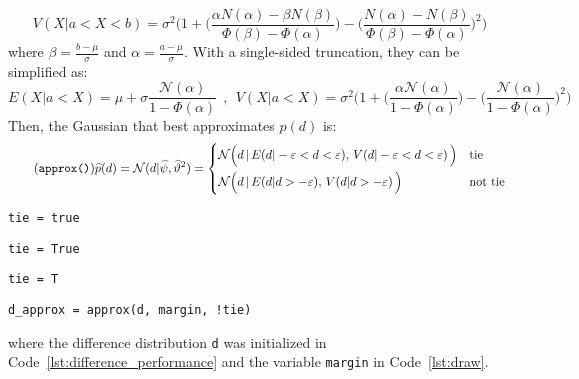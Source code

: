 \documentclass[article]{jss}
\newcommand{\N}{\mathcal{N}}
\begin{document}
%
\begin{equation}\label{eq:variance_aprox_double}
 V(X| a < X < b) = \sigma^2 \Bigg( 1 + \bigg(\frac{\alpha N(\alpha) - \beta N(\beta) }{\Phi(\beta) - \Phi(\alpha) }\bigg) - \bigg(\frac{N(\alpha) - N(\beta) }{\Phi(\beta) - \Phi(\alpha) }\bigg)^2 \Bigg)
\end{equation}
where $\beta = \frac{b-\mu}{\sigma}$ and $\alpha = \frac{a-\mu}{\sigma}$. 
With a single-sided truncation, they can be simplified as:
\begin{equation*}
 E(X| a < X )   =  \mu + \sigma \frac{\N(\alpha)}{1 - \Phi(\alpha) } \ \ , \ \ V(X| a < X )  = \sigma^2 \Bigg( 1 + \bigg(\frac{\alpha \N(\alpha)}{1 - \Phi(\alpha) }\bigg) - \bigg(\frac{\N(\alpha)}{1 - \Phi(\alpha) }\bigg)^2 \Bigg) 
\end{equation*}
%
Then, the Gaussian that best approximates $p(d)$ is:
%
\begin{equation}\label{eq:p*_d} \tag{\texttt{approx()}}
 \widehat{p}(d) = \N(d | \widehat{\psi}, \widehat{\vartheta}^2) =
 \begin{cases*}
 \N\Big(d \,  | \, E(d | -\varepsilon < d < \varepsilon ) , \,  V(d | -\varepsilon < d < \varepsilon ) \, \Big) & \text{tie} \\
\N\Big(d \,  | \, E(d | d > -\varepsilon ) , \,  V(d | d > -\varepsilon ) \, \Big) & \text{not tie}
  \end{cases*}
\end{equation}
%
\begin{paracol}{3}
\begin{lstlisting}[backgroundcolor=\color{julia!60},belowskip=0cm]
tie = true
\end{lstlisting}
\switchcolumn
\begin{lstlisting}[backgroundcolor=\color{python!60},belowskip=0cm]
tie = True
\end{lstlisting}
\switchcolumn
\begin{lstlisting}[backgroundcolor=\color{r!50},belowskip=0cm]
tie = T
\end{lstlisting}
\end{paracol}
\begin{lstlisting}[captionpos=b,backgroundcolor=\color{all},label=lst:d_approx, caption={Computing the approximation of the performance difference.},belowskip=0cm,aboveskip=0cm]
d_approx = approx(d, margin, !tie)
\end{lstlisting}
%
where the difference distribution \texttt{d} was initialized in Code~\ref{lst:difference_performance} and the variable \texttt{margin} in Code~\ref{lst:draw}. 
\end{document}
